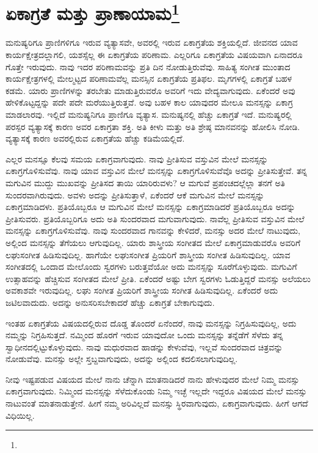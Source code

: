 
\chapter{ಏಕಾಗ್ರತೆ ಮತ್ತು ಪ್ರಾಣಾಯಾಮ\protect\footnote{}}

ಮನುಷ್ಯರಿಗೂ ಪ್ರಾಣಿಗಳಿಗೂ ಇರುವ ವ್ಯತ್ಯಾಸವೇ, ಅವರಲ್ಲಿ ಇರುವ ಏಕಾಗ್ರತೆಯ ಶಕ್ತಿಯಲ್ಲಿದೆ. ಜೀವನದ ಯಾವ ಕಾರ್ಯಕ್ಷೇತ್ರದಲ್ಲಾಗಲಿ, ಯಶಸ್ಸೆಲ್ಲ ಈ ಏಕಾಗ್ರತೆಯ ಪರಿಣಾಮ. ಎಲ್ಲರಿಗೂ ಏಕಾಗ್ರತೆಯ ವಿಷಯವಾಗಿ ಏನಾದರೂ ಗೊತ್ತೇ ಇರುವುದು. ನಾವು ಇದರ ಪರಿಣಾಮವನ್ನು ಪ್ರತಿ ದಿನ ನೋಡುತ್ತಿರುವೆವು. ಸಾಹಿತ್ಯ ಸಂಗೀತ ಮುಂತಾದ ಕಾರ್ಯಕ್ಷೇತ್ರಗಳಲ್ಲಿ ಮೇಲ್ಮಟ್ಟದ ಪರಿಣಾಮವೆಲ್ಲ ಮನಸ್ಸಿನ ಏಕಾಗ್ರತೆಯ ಪ್ರತಿಫಲ. ಮೃಗಗಳಲ್ಲಿ ಏಕಾಗ್ರತೆ ಬಹಳ ಕಡಮೆ. ಯಾರು ಪ್ರಾಣಿಗಳನ್ನು ತರಬೇತು ಮಾಡುತ್ತಿರುವರೊ ಅವರಿಗೆ ಇದು ವೇದ್ಯವಾಗುವುದು. ಏಕೆಂದರೆ ಅವು ಹೇಳಿಕೊಟ್ಟದ್ದನ್ನು ಪದೇ ಪದೇ ಮರೆಯುತ್ತಿರುತ್ತವೆ. ಅವು ಬಹಳ ಕಾಲ ಯಾವುದರ ಮೇಲೂ ಮನಸ್ಸನ್ನು ಏಕಾಗ್ರ ಮಾಡಲಾರವು. ಇಲ್ಲಿದೆ ಮನುಷ್ಯನಿಗೂ ಪ್ರಾಣಿಗೂ ವ್ಯತ್ಯಾಸ. ಮನುಷ್ಯನಲ್ಲಿ ಹೆಚ್ಚು ಏಕಾಗ್ರತೆ ಇದೆ. ಮನುಷ್ಯರಲ್ಲಿ ಪರಸ್ಪರ ವ್ಯತ್ಯಾಸಕ್ಕೆ ಕಾರಣ ಅವರ ಏಕಾಗ್ರತಾ ಶಕ್ತಿ. ಅತಿ ಕೀಳು ಮತ್ತು ಅತಿ ಶ್ರೇಷ್ಠ ಮಾನವನನ್ನು ಹೋಲಿಸಿ ನೋಡಿ. ವ್ಯತ್ಯಾಸಕ್ಕೆ ಕಾರಣ ಅವರಲ್ಲಿರುವ ಏಕಾಗ್ರತೆಯ ಹೆಚ್ಚು ಕಡಿಮೆಯಲ್ಲಿದೆ.

ಎಲ್ಲರ ಮನಸ್ಸೂ ಕೆಲವು ಸಮಯ ಏಕಾಗ್ರವಾಗುವುದು. ನಾವು ಪ್ರೀತಿಸುವ ವಸ್ತುವಿನ ಮೇಲೆ ಮನಸ್ಸನ್ನು ಏಕಾಗ್ರಗೊಳಿಸುವೆವು. ನಾವು ಯಾವ ವಸ್ತುವಿನ ಮೇಲೆ ಮನಸ್ಸನ್ನು ಏಕಾಗ್ರಗೊಳಿಸುವೆವೊ ಅದನ್ನು ಪ್ರೀತಿಸುತ್ತೇವೆ. ತನ್ನ ಮಗುವಿನ ಮುದ್ದು ಮುಖವನ್ನು ಪ್ರೀತಿಸದ ತಾಯಿ ಯಾರಿರುವಳು? ಆ ಮಗುವೆ ಪ್ರಪಂಚದಲ್ಲೆಲ್ಲಾ ತನಗೆ ಅತಿ ಸುಂದರವಾಗಿರುವುದು. ಅವಳು ಅದನ್ನು ಪ್ರೀತಿಸುತ್ತಾಳೆ, ಏಕೆಂದರೆ ಆಕೆ ಮಗುವಿನ ಮೇಲೆ ಮನಸ್ಸನ್ನು ಏಕಾಗ್ರಮಾಡಿದಳು. ಪ್ರತಿಯೊಬ್ಬರೂ ಆ ಮಗುವಿನ ಮೇಲೆ ಮನಸ್ಸನ್ನು ಏಕಾಗ್ರಮಾಡಿದರೆ ಪ್ರತಿಯೊಬ್ಬರೂ ಅದನ್ನು ಪ್ರೀತಿಸುವರು. ಪ್ರತಿಯೊಬ್ಬರಿಗೂ ಅದು ಅತಿ ಸುಂದರವಾದ ಮಗುವಾಗುವುದು. ನಾವೆಲ್ಲ ಪ್ರೀತಿಸುವ ವಸ್ತುವಿನ ಮೇಲೆ ಮನಸ್ಸನ್ನು ಏಕಾಗ್ರಗೊಳಿಸುವೆವು. ನಾವು ಸುಂದರವಾದ ಗಾನವನ್ನು ಕೇಳಿದರೆ, ಮನಸ್ಸು ಅದರ ಮೇಲೆ ನಾಟುವುದು, ಅಲ್ಲಿಂದ ಮನಸ್ಸನ್ನು ತೆಗೆಯಲು ಆಗುವುದಿಲ್ಲ. ಯಾರು ಶಾಸ್ತ್ರೀಯ ಸಂಗೀತದ ಮೇಲೆ ಏಕಾಗ್ರಮಾಡುವರೊ ಅವರಿಗೆ ಲಘುಸಂಗೀತ ಹಿಡಿಸುವುದಿಲ್ಲ. ಹಾಗೆಯೇ ಲಘುಸಂಗೀತ ಪ್ರಿಯರಿಗೆ ಶಾಸ್ತ್ರೀಯ ಸಂಗೀತ ಹಿಡಿಸುವುದಿಲ್ಲ. ಯಾವ ಸಂಗೀತದಲ್ಲಿ ಒಂದಾದ ಮೇಲೊಂದು ಸ್ವರಗಳು ಬರುತ್ತವೆಯೋ ಅದು ಮನಸ್ಸನ್ನು ಸೂರೆಗೊಳ್ಳುವುದು. ಮಗುವಿಗೆ ಉತ್ಸಾಹವನ್ನು ಹೆಚ್ಚಿಸುವ ಸಂಗೀತದ ಮೇಲೆ ಪ್ರೀತಿ. ಏಕೆಂದರೆ ಅಷ್ಟು ಬೇಗ ಸ್ವರಗಳು ಓಡುತ್ತಿದ್ದರೆ ಮನಸ್ಸು ಅಲೆಯಲು ಅವಕಾಶವೇ ಇರುವುದಿಲ್ಲ. ಲಘು ಸಂಗೀತ ಪ್ರಿಯರಿಗೆ ಶಾಸ್ತ್ರೀಯ ಸಂಗೀತ ಹಿಡಿಸುವುದಿಲ್ಲ. ಏಕೆಂದರೆ ಅದು ಜಟಿಲವಾದುದು. ಅದನ್ನು ಅನುಸರಿಸಬೇಕಾದರೆ ಹೆಚ್ಚು ಏಕಾಗ್ರತೆ ಬೇಕಾಗುವುದು.

ಇಂತಹ ಏಕಾಗ್ರತೆಯ ವಿಷಯದಲ್ಲಿರುವ ದೊಡ್ಡ ತೊಂದರೆ ಏನೆಂದರೆ, ನಾವು ಮನಸ್ಸನ್ನು ನಿಗ್ರಹಿಸುವುದಿಲ್ಲ, ಅದು ನಮ್ಮನ್ನು ನಿಗ್ರಹಿಸುತ್ತದೆ. ನಮ್ಮಿಂದ ಹೊರಗೆ ಇರುವ ಯಾವುದೋ ಒಂದು ಮನಸ್ಸನ್ನು ತನ್ನೆಡೆಗೆ ಸೆಳೆದು ತನ್ನ ಸ್ವಾಧೀನದಲ್ಲಿಟ್ಟುಕೊಳ್ಳುವುದು. ನಾವು ಮಧುರವಾದ ಹಾಡನ್ನು ಕೇಳುವೆವು, ಇಲ್ಲವೆ ಸುಂದರವಾದ ಚಿತ್ರವನ್ನು ನೋಡುವೆವು. ಮನಸ್ಸು ಅಲ್ಲೇ ಸ್ತಬ್ದವಾಗುವುದು, ಅದನ್ನು ಅಲ್ಲಿಂದ ಕದಲಿಸಲಾಗುವುದಿಲ್ಲ.

ನೀವು ಇಷ್ಟಪಡುವ ವಿಷಯದ ಮೇಲೆ ನಾನು ಚೆನ್ನಾಗಿ ಮಾತನಾಡಿದರೆ ನಾನು ಹೇಳುವುದರ ಮೇಲೆ ನಿಮ್ಮ ಮನಸ್ಸು ಏಕಾಗ್ರವಾಗುವುದು. ನಿಮ್ಮಿಂದ ಮನಸ್ಸನ್ನು ಸೆಳೆದುಕೊಂಡು ನಿಮ್ಮ ಇಚ್ಛೆ ಇಲ್ಲದೇ ಇದ್ದರೂ ವಿಷಯದ ಮೇಲೆ ಮನಸ್ಸು ನಾಟುವಂತೆ ಮಾತನಾಡುತ್ತೇನೆ. ಹೀಗೆ ನಮ್ಮ ಅರಿವಿಲ್ಲದೆ ಮನಸ್ಸು ಸ್ಥಿರವಾಗುವುದು, ಏಕಾಗ್ರವಾಗುವುದು. ಹೀಗೆ ಆಗದೆ ವಿಧಿಯಿಲ್ಲ.

